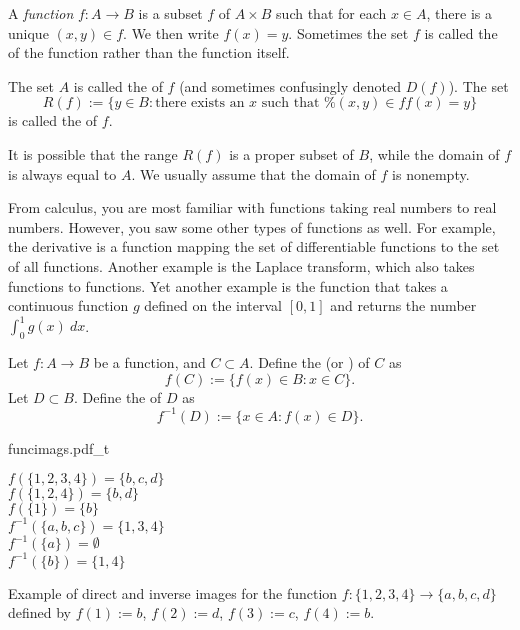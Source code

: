 \begin{defn}
A \emph{function} $f \colon A \to B$ is a subset $f$ of $A \times B$
such that for each $x \in A$, there is a unique $(x,y) \in f$.  We then
write $f(x) = y$.  Sometimes
the set $f$ is called the \emph{} of the function rather than
the function itself.

The set $A$ is called the \emph{} of $f$ (and
sometimes confusingly denoted $D(f)$).  The set
\begin{equation*}
R(f) := \{ y \in B : \text{there exists an $x$ such that
$f(x)=y$
} \}
\end{equation*}
is called the \emph{} of $f$.
\end{defn}

It is possible that the range $R(f)$ is a proper subset of $B$,
while the domain of $f$ is always equal to $A$.  We usually 
assume that the domain of $f$ is nonempty.

\begin{example}
From calculus, you are most familiar with functions taking real numbers to real
numbers.  However, you saw some other types of functions as well.  For
example, the derivative is a function mapping the set of
differentiable functions to the set of all functions.
Another example is the Laplace transform, which also
takes functions to functions.  Yet another example is the function that takes
a continuous function $g$ defined on the interval $[0,1]$ and returns the
number $\int_0^1 g(x) ~dx$.
\end{example}

\begin{defn}
Let $f \colon A \to B$ be a function, and $C \subset A$.  Define
the \emph{} (or \emph{}) of $C$ as
\begin{equation*}
f(C) := \bigl\{ f(x) \in B : x \in C \bigr\} .
\end{equation*}
Let $D \subset B$.  Define the \emph{} of $D$ as
\begin{equation*}
f^{-1}(D) := \bigl\{ x \in A : f(x) \in D \bigr\} .
\end{equation*}
\end{defn}
\begin{myfigureht}
\parbox{2.5in}{{funcimags.pdf_t}}
\parbox{2in}{%
$f(\{1,2,3,4\}) = \{ b, c, d \}$\\[3pt]
$f(\{1,2,4\}) = \{ b, d \}$\\[3pt]
$f(\{1\}) = \{ b \}$\\[3pt]
$f^{-1}(\{a,b,c\}) = \{ 1, 3, 4 \}$\\[3pt]
$f^{-1}(\{a\}) = \emptyset$\\[3pt]
$f^{-1}(\{b\}) = \{ 1, 4 \}$
}
\caption{Example of direct and inverse images for the function $f \colon \{ 1,2,3,4 \} \to \{
a,b,c,d \}$ defined by
$f(1) := b$,
$f(2) := d$,
$f(3) := c$,
$f(4) := b$.\label{figfuncimags}}
\end{myfigureht}

